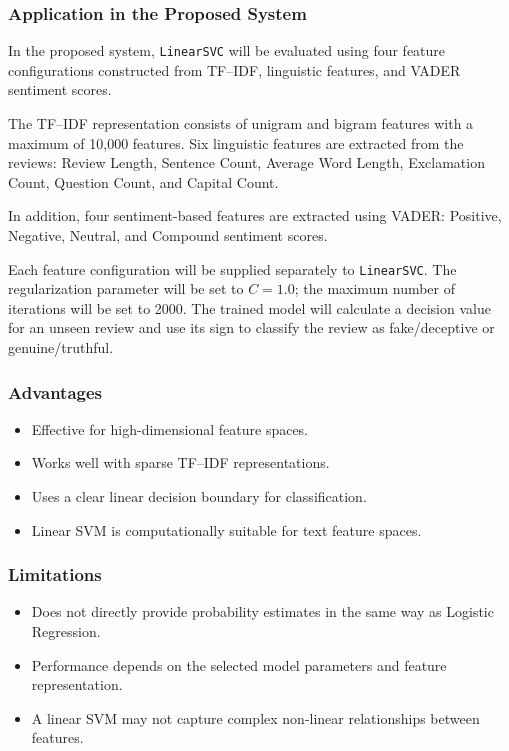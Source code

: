 \documentclass[12pt,a4paper]{report}
\begin{document}
\subsubsection*{Application in the Proposed System}

In the proposed system, \texttt{LinearSVC} will be evaluated using four feature configurations constructed from TF--IDF, linguistic features, and VADER sentiment scores.

The TF--IDF representation consists of unigram and bigram features with a maximum of 10,000 features. Six linguistic features are extracted from the reviews: Review Length, Sentence Count, Average Word Length, Exclamation Count, Question Count, and Capital Count.

In addition, four sentiment-based features are extracted using VADER: Positive, Negative, Neutral, and Compound sentiment scores.

Each feature configuration will be supplied separately to \texttt{LinearSVC}. The regularization parameter will be set to \(C=1.0\); the maximum number of iterations will be set to 2000. The trained model will calculate a decision value for an unseen review and use its sign to classify the review as fake/deceptive or genuine/truthful.

\subsubsection*{Advantages}

\begin{itemize}
    \item Effective for high-dimensional feature spaces.
    \item Works well with sparse TF--IDF representations.
    \item Uses a clear linear decision boundary for classification.
    \item Linear SVM is computationally suitable for text feature spaces.
\end{itemize}

\subsubsection*{Limitations}

\begin{itemize}
    \item Does not directly provide probability estimates in the same way as Logistic Regression.
    \item Performance depends on the selected model parameters and feature representation.
    \item A linear SVM may not capture complex non-linear relationships between features.
\end{itemize}
\end{document}
